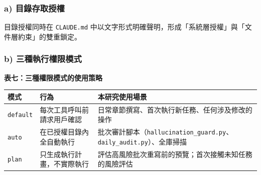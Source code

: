 \subsubsection{a)
目錄存取授權}\label{a-ux76eeux9304ux5b58ux53d6ux6388ux6b0a}

\begin{Shaded}
\begin{Highlighting}[]

 
\end{Highlighting}
\end{Shaded}

目錄授權同時在 \texttt{CLAUDE.md}
中以文字形式明確聲明，形成「系統層授權」與「文件層約束」的雙重鎖定。

\subsubsection{b)
三種執行權限模式}\label{b-ux4e09ux7a2eux57f7ux884cux6b0aux9650ux6a21ux5f0f}

\textbf{表七：三種權限模式的使用策略}

{\def\LTcaptype{none} %
\begin{longtable}[]{@{}
  >{\raggedright\arraybackslash}p{}
  >{\raggedright\arraybackslash}p{}
  >{\raggedright\arraybackslash}p{}@{}}
\toprule\noalign{}
\begin{minipage}[b]{\linewidth}\raggedright
模式
\end{minipage} & \begin{minipage}[b]{\linewidth}\raggedright
行為
\end{minipage} & \begin{minipage}[b]{\linewidth}\raggedright
本研究使用場景
\end{minipage} \\
\midrule\noalign{}
\endhead
\bottomrule\noalign{}
\endlastfoot
\texttt{default} & 每次工具呼叫前請求用戶確認 &
日常章節撰寫、首次執行新任務、任何涉及修改的操作 \\
\texttt{auto} & 在已授權目錄內全自動執行 &
批次審計腳本（\texttt{hallucination\_guard.py}、\texttt{daily\_audit.py}）、全庫掃描 \\
\texttt{plan} & 只生成執行計畫，不實際執行 &
評估高風險批次重寫前的預覽；首次接觸未知任務的風險評估 \\
\end{longtable}
}


